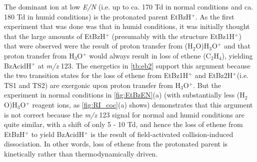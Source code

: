 The dominant ion at low \textit{E/N} (i.e. up to ca. 170 Td in normal conditions and ca. 180 Td in humid conditions) is the protonated parent EtBzH$^+$.
%
%
%
As the first experiment that was done was that in humid conditions, it was initially thought that the large amounts of EtBzH$^+$ (presumably with the structure EtBz1H$^+$) that were observed  were the result of proton transfer from (H$_2$O)H$_3$O$^+$ and that proton transfer from H$_3$O$^+$ would always result in loss of ethene  (C$_2$H$_4$), yielding BzAcidH$^+$ at \textit{m/z} 123. The energetics in \autoref{tb:eb2} support this argument because the two transition states for the loss of ethene from EtBz1H$^+$ and EtBz2H$^+$(i.e. TS1 and TS2) are exergonic upon proton transfer from H$_3$O$^+$.
%
But the experiment in normal conditions in \autoref{fig:EtBzEN}(a) (with substantially less (H$_2$O)H$_3$O$^+$ reagent ions, as \autoref{fig:RI_coc}(a) shows) demonstrates that this argument is not correct because the \textit{m/z} 123 signal for normal and humid conditions are quite similar, with a shift of only 5 - 10 Td, and hence the loss of ethene from EtBzH$^+$ to yield BzAcidH$^+$ is the result of field-activated collision-induced dissociation.
%
In other words, loss of ethene from the protonated parent is kinetically rather than thermodynamically driven.








%

